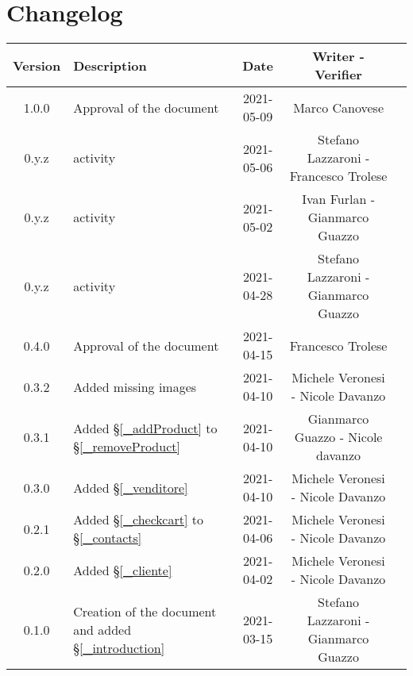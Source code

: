 \section*{Changelog}

\begin{center}
	\begin{longtable}{|c|p{5cm}|c|c|c|}
	\hline
	\rowcolor{lighter-grayer}
	\textbf{Version} & \textbf{Description} & \textbf{Date} & \textbf{Writer - Verifier} \\
	\hline
	\endfirsthead


	\hline
	1.0.0 & Approval of the document & 2021-05-09 & Marco Canovese\\
	0.y.z & activity & 2021-05-06 & Stefano Lazzaroni - Francesco Trolese \\
	0.y.z & activity & 2021-05-02 & Ivan Furlan - Gianmarco Guazzo \\
	0.y.z & activity & 2021-04-28 & Stefano Lazzaroni - Gianmarco Guazzo \\
	0.4.0 & Approval of the document & 2021-04-15 & Francesco Trolese\\
	0.3.2 & Added missing images & 2021-04-10 & Michele Veronesi - Nicole Davanzo\\
	0.3.1 & Added \S\ref{_addProduct} to \S\ref{_removeProduct}  & 2021-04-10 & Gianmarco Guazzo - Nicole davanzo\\
	0.3.0 & Added \S\ref{_venditore} & 2021-04-10 & Michele Veronesi - Nicole Davanzo\\
	0.2.1 & Added \S\ref{_checkcart} to \S\ref{_contacts} & 2021-04-06 & Michele Veronesi - Nicole Davanzo\\
	0.2.0 & Added \S\ref{_cliente} & 2021-04-02 & Michele Veronesi - Nicole Davanzo\\
	0.1.0 & Creation of the document and added \S\ref{_introduction}  & 2021-03-15 & Stefano Lazzaroni - Gianmarco Guazzo\\
	\hline

	\end{longtable}
\end{center}